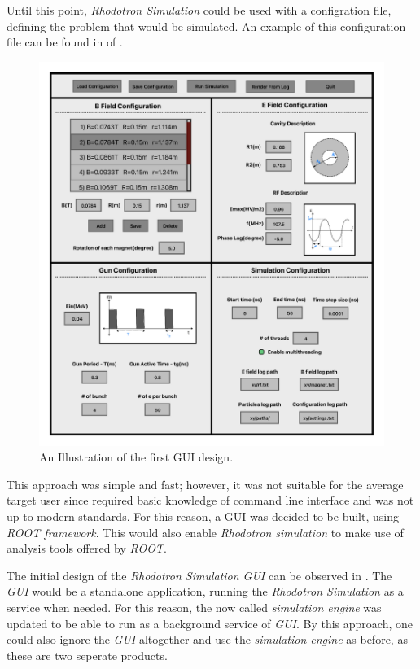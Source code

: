 \documentclass[a4paper,oneside,12pt]{report}
\numberwithin{equation}{chapter}
\begin{document}
Until this point, \textit{Rhodotron Simulation} could be used with a configration file, defining the problem that would be simulated.
An example of this configuration file can be found in  of . 
\vspace{10pt}
\begin{figure}[H]
    \centering
    \includegraphics[width=\linewidth]{./figures/illustrations/RhodoSim_GUI_Draft_V02.pdf}
    \caption{An Illustration of the first GUI design.}
    \label{fig:gui_illustration}
\end{figure}
\clearpage
This approach was simple and fast; however, it was not suitable for the average target user since required basic knowledge of command line interface and was not up to modern standards.
For this reason, a GUI was decided to be built, using \textit{ROOT framework}. 
This would also enable \textit{Rhodotron simulation} to make use of analysis tools offered by \textit{ROOT}.

The initial design of the \textit{Rhodotron Simulation GUI} can be observed in .
The \textit{GUI} would be a standalone application, running the \textit{Rhodotron Simulation} as a service when needed. 
For this reason, the now called \textit{simulation engine} was updated to be able to run as a background service of \textit{GUI}.
By this approach, one could also ignore the \textit{GUI} altogether and use the \textit{simulation engine} as before, as these are two seperate products.
\end{document}
